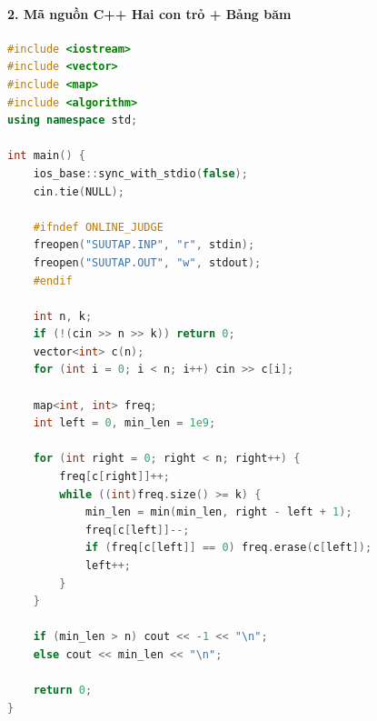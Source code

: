 \documentclass[11pt,a4paper]{article}
\begin{document}
\paragraph{2. Mã nguồn C++ Hai con trỏ + Bảng băm}
\begin{lstlisting}[language=C++]
#include <iostream>
#include <vector>
#include <map>
#include <algorithm>
using namespace std;

int main() {
    ios_base::sync_with_stdio(false);
    cin.tie(NULL);

    #ifndef ONLINE_JUDGE
    freopen("SUUTAP.INP", "r", stdin);
    freopen("SUUTAP.OUT", "w", stdout);
    #endif

    int n, k;
    if (!(cin >> n >> k)) return 0;
    vector<int> c(n);
    for (int i = 0; i < n; i++) cin >> c[i];

    map<int, int> freq;
    int left = 0, min_len = 1e9;

    for (int right = 0; right < n; right++) {
        freq[c[right]]++;
        while ((int)freq.size() >= k) {
            min_len = min(min_len, right - left + 1);
            freq[c[left]]--;
            if (freq[c[left]] == 0) freq.erase(c[left]);
            left++;
        }
    }

    if (min_len > n) cout << -1 << "\n";
    else cout << min_len << "\n";

    return 0;
}
\end{lstlisting}
\end{document}

